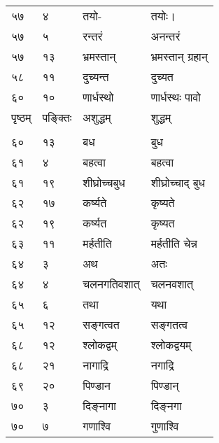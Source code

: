 \documentclass[11pt, openany]{book}
\begin{document}
\begin{longtable}{p{1cm} p{1.5cm} p{4cm} p{4cm}}
 ५७ & ४ & तयो- & तयोः।\\

 ५७ & ५ & रन्तरं & अनन्तरं\\

 ५७ & १३ & भ्रमस्तान् & भ्रमस्तान् ग्रहान्\\

 ५८ & ११ & दुच्यन्त & दुच्यत\\

 ६० & १० & णार्धस्थो & णार्धस्थः पावो\\



\newpage



पृष्ठम् & पङ्क्तिः & अशुद्धम् & शुद्धम्\\
\vspace{2mm}\\

 ६० & १३ & बध & बुध\\

 ६१ & ४ & बहत्वा & बहत्वा\\

 ६१ & १९ & शीघ्रोच्चबुध & शीघ्रोच्चाद् बुध\\

 ६२ & १७ & कर्ष्यते & कृष्यते \\

 ६२ & १९ & कर्ष्यत & कृष्यत\\

 ६३ & ११ & मर्हतीति & मर्हतीति चेन्न\\

 ६४ & ३ & अथ & अतः \\

 ६४ & ४ & चलनगतिवशात् & चलनवशात्\\

 ६५ & ६ & तथा & यथा\\

 ६५ & १२ & सङ्गत्वत & सङ्गतत्व\\

 ६८ & १२ & श्लोकद्वम् & श्लोकद्वयम्\\

 ६८ & २१ & नागाद्रि & नगाद्रि \\

 ६९ & २० &  पिण्डान & पिण्डान्\\

 ७० & ३ & दिङ्नागा & दिङ्नगा\\

 ७० & ७ & गणाश्वि & गुणाश्वि\\


\end{longtable}
\end{document}
